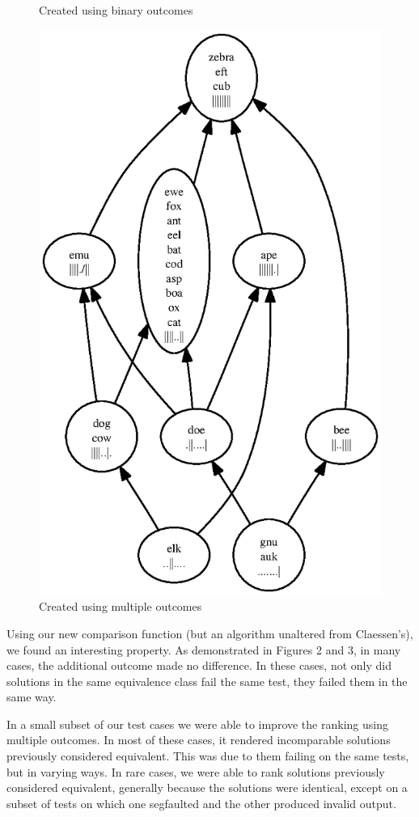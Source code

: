 \documentclass[11pt,twoside]{article}
\theoremstyle{definition}
\begin{document}
\begin{figure}
\caption{Created using binary outcomes}
\includegraphics[scale=0.75]{rank2.ps}
\caption{Created using multiple outcomes}
\end{figure}

Using our new comparison function (but an algorithm unaltered from Claessen's), we found an interesting property. As demonstrated in Figures 2 and 3, in many cases, the additional outcome made no difference. In these cases, not only did solutions in the same equivalence class fail the same test, they failed them in the same way.

In a small subset of our test cases
we were able to improve the ranking using multiple outcomes. In most of these cases, it rendered incomparable solutions previously considered equivalent. This was due to them failing on the same tests, but in varying ways. In rare cases, we were able to rank solutions previously considered equivalent, generally because the solutions were identical, except on a subset of tests on which one segfaulted and the other produced invalid output.
\end{document}
